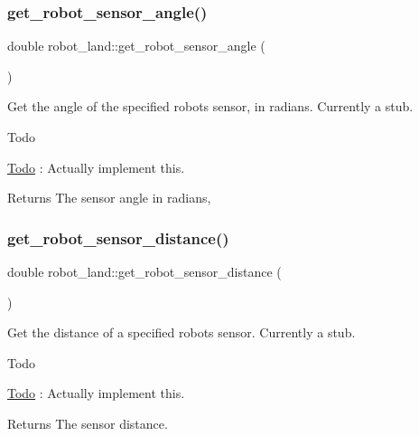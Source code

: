 \subsubsection{\texorpdfstring{get\+\_\+robot\+\_\+sensor\+\_\+angle()}{get\_robot\_sensor\_angle()}}
{\footnotesize\ttfamily double robot\+\_\+land\+::get\+\_\+robot\+\_\+sensor\+\_\+angle (\begin{DoxyParamCaption}{ }\end{DoxyParamCaption})}



Get the angle of the specified robots sensor, in radians. Currently a stub. 

\begin{DoxyRefDesc}{Todo}
\item[\hyperlink{todo__todo000006}{Todo}]\+: Actually implement this.\end{DoxyRefDesc}


\begin{DoxyReturn}{Returns}
The sensor angle in radians, 
\end{DoxyReturn}
\mbox{\label{classrobot__land_a4bef892a1b2c7c6a539dfed5fd2abae5}} 
\subsubsection{\texorpdfstring{get\+\_\+robot\+\_\+sensor\+\_\+distance()}{get\_robot\_sensor\_distance()}}
{\footnotesize\ttfamily double robot\+\_\+land\+::get\+\_\+robot\+\_\+sensor\+\_\+distance (\begin{DoxyParamCaption}{ }\end{DoxyParamCaption})}



Get the distance of a specified robot\textquotesingle{}s sensor. Currently a stub. 

\begin{DoxyRefDesc}{Todo}
\item[\hyperlink{todo__todo000007}{Todo}]\+: Actually implement this.\end{DoxyRefDesc}


\begin{DoxyReturn}{Returns}
The sensor distance. 
\end{DoxyReturn}
\mbox{\label{classrobot__land_a2c12e8cb4cea6ca18db18b30b205b6a8}} 
